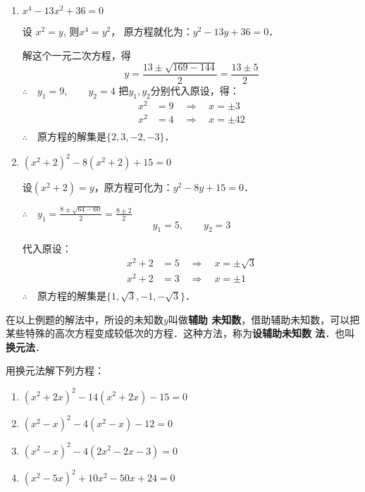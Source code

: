 \begin{solution}
\begin{enumerate}
    \item $x^4-13x^2+36=0$

    设 $x^2=y$, 则$x^4=y^2$，
    原方程就化为：$y^2-13y+36=0$．

    解这个一元二次方程，得
\[y=\frac{13\pm \sqrt{169-144}}{2}=\frac{13\pm 5}{2}\]
$\therefore\quad y_1=9,\qquad y_2=4$
把$y_1,y_2$分别代入原设，得：
\begin{align*}
    x^2&=9 \quad \Rightarrow\quad  x=\pm 3\\
    x^2&=4 \quad \Rightarrow\quad  x=\pm 42\\
\end{align*}
$\therefore\quad $原方程的解集是$\{2,3,-2,-3\}$．

\item $(x^2+2)^2-8(x^2+2)+15=0$

设$(x^2+2)=y$，原方程可化为：$y^2-8y+15=0$．

$\therefore\quad y_1=\frac{8\pm\sqrt{64-60}}{2}=\frac{8\pm 2}{2}$
\[y_1=5,\qquad y_2=3\]

代入原设：
\begin{align*}
    x^2+2&=5 \quad \Rightarrow\quad  x=\pm\sqrt{3}\\
    x^2+2&=3 \quad \Rightarrow\quad  x=\pm 1\\
\end{align*}
$\therefore\quad $原方程的解集是$\{1,\sqrt{3},-1,-\sqrt{3}\}$．

\end{enumerate}    
\end{solution}

在以上例题的解法中，所设的未知数$y$叫做\textbf{辅助
未知数}，借助辅助未知数，可以把某些特殊的高次方程变成较低次的方程．这种方法，称为\textbf{设辅助未知数
法}．也叫\textbf{换元法}．

\begin{ex}
    用换元法解下列方程：
    
\begin{enumerate}
    \item $(x^2+2x)^2-14(x^2+2x)-15=0$
    \item $(x^2-x)^2-4(x^2-x)-12=0$
    \item $(x^2-x)^2-4(2x^2-2x-3)=0$
    \item $(x^2-5x)^2+10x^2-50x+24=0$
\end{enumerate}        
    

\end{ex}

